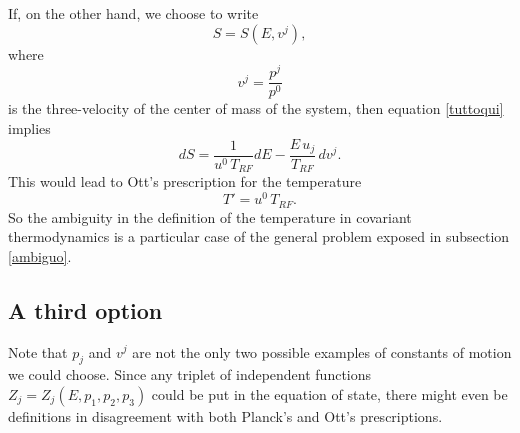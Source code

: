 \documentclass[twocolumn,usenatbib]{mnras2}
\begin{document}
If, on the other hand, we choose to write
\begin{equation}
S=S(E,v^j),
\end{equation}
where
\begin{equation}
v^j=\dfrac{p^j}{p^0}
\end{equation}
is the three-velocity of the center of mass of the system, then equation \eqref{tuttoqui} implies
\begin{equation}
dS= \dfrac{1}{u^0 \, T_{RF}} dE - \dfrac{ E \, u_j}{T_{RF}} \, dv^j.
\end{equation}
This would lead to Ott's prescription for the temperature
\begin{equation}\label{Ott}
T'= u^0 \, T_{RF}.
\end{equation}
So the ambiguity in the definition of the temperature in covariant thermodynamics is a particular case of the general problem exposed in subsection \ref{ambiguo}.  


 

\subsection{A third option}\label{third}

Note that $p_j$ and $v^j$ are not the only two possible examples of constants of motion we could choose. Since any triplet of independent functions $Z_j= Z_j(E,p_1,p_2,p_3)$ could be put in the equation of state, there might even be definitions in disagreement with both Planck's and Ott's prescriptions.
\end{document}
